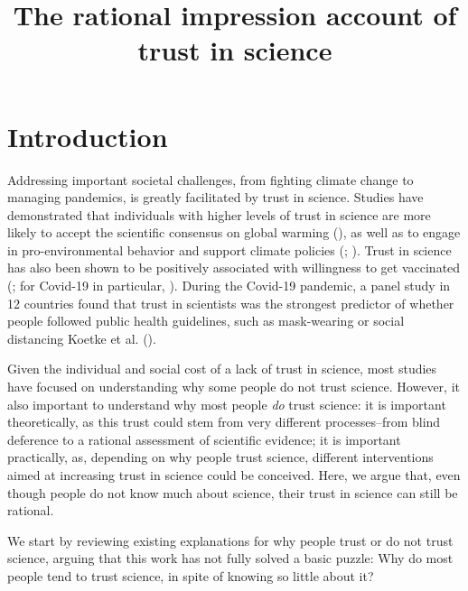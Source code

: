 \documentclass[
  man,
  floatsintext,
  longtable,
  nolmodern,
  notxfonts,
  notimes,
  colorlinks=true,linkcolor=blue,citecolor=blue,urlcolor=blue]{apa7}
\title{The rational impression account of trust in science}
\begin{document}
\maketitle


\setcounter{secnumdepth}{-\maxdimen} %

\setlength\LTleft{0pt}


\section{Introduction}\label{introduction}

Addressing important societal challenges, from fighting climate change
to managing pandemics, is greatly facilitated by trust in science.
Studies have demonstrated that individuals with higher levels of trust
in science are more likely to accept the scientific consensus on global
warming (), as well as to engage in pro-environmental behavior and support
climate policies (;
). Trust in science has also been shown to be positively
associated with willingness to get vaccinated
(; for
Covid-19 in particular,
). During the Covid-19 pandemic, a panel study in 12 countries
found that trust in scientists was the strongest predictor of whether
people followed public health guidelines, such as mask-wearing or social
distancing Koetke et al.
().

Given the individual and social cost of a lack of trust in science, most
studies have focused on understanding why some people do not trust
science. However, it also important to understand why most people
\emph{do} trust science: it is important theoretically, as this trust
could stem from very different processes--from blind deference to a
rational assessment of scientific evidence; it is important practically,
as, depending on why people trust science, different interventions aimed
at increasing trust in science could be conceived. Here, we argue that,
even though people do not know much about science, their trust in
science can still be rational.

We start by reviewing existing explanations for why people trust or do
not trust science, arguing that this work has not fully solved a basic
puzzle: Why do most people tend to trust science, in spite of knowing so
little about it?
\end{document}
